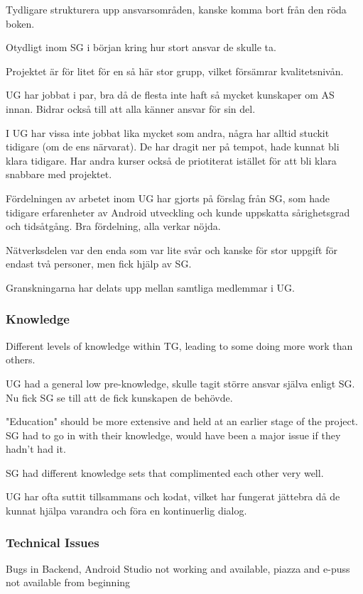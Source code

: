 \documentclass[a4paper]{article}
\begin{document}
Tydligare strukturera upp ansvarsområden, kanske komma bort från den röda boken. 

Otydligt inom SG i början kring hur stort ansvar de skulle ta.

Projektet är för litet för en så här stor grupp, vilket försämrar kvalitetsnivån.

UG har jobbat i par, bra då de flesta inte haft så mycket kunskaper om AS innan. Bidrar också till att alla känner ansvar för sin del.

I UG har vissa inte jobbat lika mycket som andra, några har alltid stuckit tidigare (om de ens närvarat). De har dragit ner på tempot, hade kunnat bli klara tidigare. Har andra kurser också de priotiterat istället för att bli klara snabbare med projektet.

Fördelningen av arbetet inom UG har gjorts på förslag från SG, som hade tidigare erfarenheter av Android utveckling och kunde uppskatta sårighetsgrad och tidsåtgång. Bra fördelning, alla verkar nöjda.

Nätverksdelen var den enda som var lite svår och kanske för stor uppgift för endast två personer, men fick hjälp av SG.

Granskningarna har delats upp mellan samtliga medlemmar i UG.

\subsubsection{Knowledge}
Different levels of knowledge within TG, leading to some doing more work than others. 

UG had a general low pre-knowledge, skulle tagit större ansvar själva enligt SG. Nu fick SG se till att de fick kunskapen de behövde. 

"Education" should be more extensive and held at an earlier stage of the project. SG had to go in with their knowledge, would have been a major issue if they hadn't had it.

SG had different knowledge sets that complimented each other very well.

UG har ofta suttit tillsammans och kodat, vilket har fungerat jättebra då de kunnat hjälpa varandra och föra en kontinuerlig dialog.


\subsubsection{Technical Issues}
Bugs in Backend, Android Studio not working and available, piazza and e-puss not available from beginning
\end{document}
